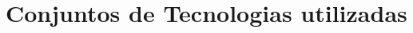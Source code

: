 \documentclass[
	12pt,				%
	openright,			%
	oneside,			%
	a4paper,			%
	english,			%
	french,				%
	spanish,			%
	brazil				%
	]{elementos/customizacao}
\begin{document}



%


\chapter{Conjuntos de Tecnologias utilizadas}





\end{document}
